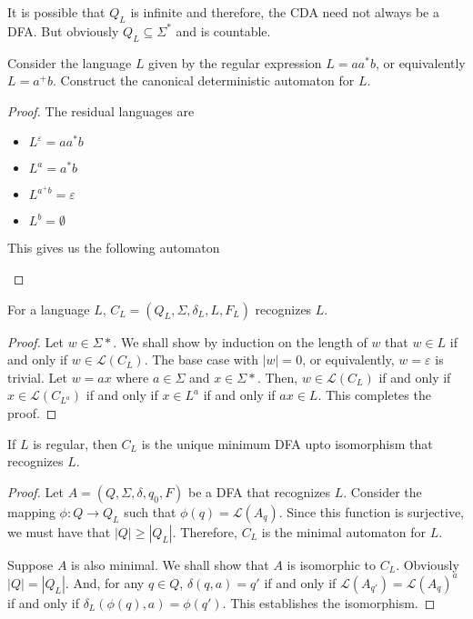 It is possible that $Q_L$ is infinite and therefore, the CDA need not always be a DFA. But obviously $Q_L\subseteq\Sigma^*$ and is countable. 

\begin{example}
    Consider the language $L$ given by the regular expression $L = aa^*b$, or equivalently $L = a^+b$. Construct the canonical deterministic automaton for $L$.
\end{example}
\begin{proof}
    The residual languages are
    \begin{itemize}
        \item $L^\varepsilon = aa^*b$ 
        \item $L^a = a^*b$ 
        \item $L^{a^+b} = \varepsilon$
        \item $L^{b} = \emptyset$
    \end{itemize}

    This gives us the following automaton 
    \begin{center}
    \end{center}
\end{proof}

\begin{proposition}
    For a language $L$, $C_L=(Q_L,\Sigma,\delta_L,L,F_L)$ recognizes $L$.
\end{proposition}
\begin{proof}
    Let $w\in\Sigma*$. We shall show by induction on the length of $w$ that $w\in L$ if and only if $w\in\mathcal{L}(C_L)$. The base case with $|w| = 0$, or equivalently, $w = \varepsilon$ is trivial. Let $w = ax$ where $a\in\Sigma$ and $x\in\Sigma*$. Then, $w\in\mathcal{L}(C_L)$ if and only if $x\in\mathcal{L}(C_{L^a})$ if and only if $x\in L^a$ if and only if $ax\in L$. This completes the proof.
\end{proof}

\begin{proposition}
    If $L$ is regular, then $C_L$ is the unique minimum DFA upto isomorphism that recognizes $L$.
\end{proposition}
\begin{proof}
    Let $A = (Q,\Sigma,\delta,q_0,F)$ be a DFA that recognizes $L$. Consider the mapping $\phi:Q\to Q_L$ such that $\phi(q) = \mathcal{L}(A_q)$. Since this function is surjective, we must have that $|Q|\ge|Q_L|$. Therefore, $C_L$ is the minimal automaton for $L$.

    Suppose $A$ is also minimal. We shall show that $A$ is isomorphic to $C_L$. Obviously $|Q| = |Q_L|$. And, for any $q\in Q$, $\delta(q, a) = q'$ if and only if $\mathcal{L}(A_{q'}) = \mathcal{L}(A_q)^a$ if and only if $\delta_L(\phi(q), a) = \phi(q')$. This establishes the isomorphism.
\end{proof}

